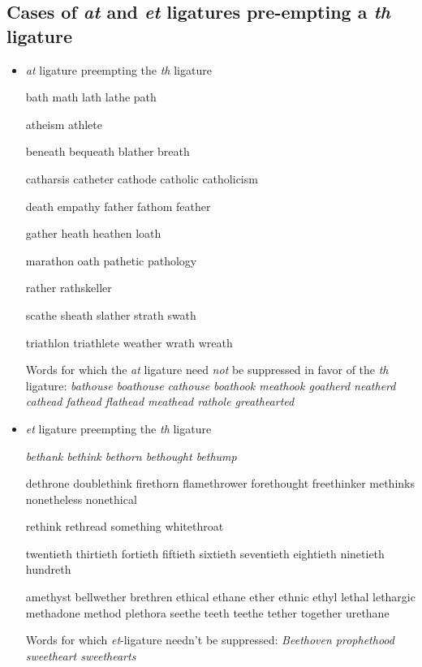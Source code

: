 \subsection*{Cases of \emph{at} and \emph{et} ligatures pre-empting a \emph{th} ligature}

\begin{itemize}
\item \emph{at} ligature preempting the \emph{th} ligature

\bgroup \em

bath math lath lathe path 

atheism athlete 

beneath bequeath blather breath 

catharsis catheter cathode catholic catholicism

death empathy father fathom feather 

gather heath heathen loath

marathon oath pathetic pathology

rather rathskeller

scathe sheath slather strath swath 

triathlon triathlete weather wrath wreath 


\egroup
\medskip
Words for which the \emph{at} ligature need \emph{not} be suppressed in favor of the \emph{th} ligature:
\emph{bathouse boathouse cathouse boathook meathook goatherd neatherd cathead fathead flathead meathead rathole greathearted}


\item \emph{et} ligature preempting the \emph{th} ligature

\bgroup \em
bethank bethink bethorn bethought bethump 

dethrone doublethink firethorn flamethrower forethought freethinker methinks nonetheless nonethical 

rethink rethread something whitethroat

twentieth thirtieth fortieth fiftieth sixtieth seventieth eightieth ninetieth hundreth 

amethyst bellwether brethren ethical ethane ether ethnic ethyl lethal lethargic methadone method plethora seethe teeth teethe tether together urethane 

\egroup
\medskip
Words for which \emph{et}-ligature needn't be suppressed:
\emph{Beethoven prophethood sweetheart sweethearts}

\end{itemize}


